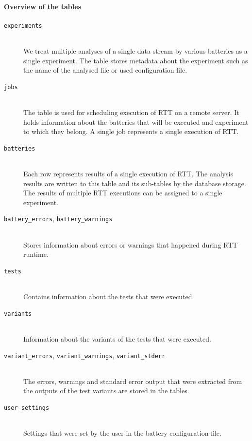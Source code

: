 \documentclass[
	digital,    %
	oneside,    %
	color,
	11pt,
	nocover,
	notable,
	nolof,
	nolot,
]{fithesis3}
\theoremstyle{definition}
\theoremstyle{remark}
\begin{document}
\paragraph*{Overview of the tables}
\begin{description}
\item[\texttt{experiments}] \hfill \\
We treat multiple analyses of a single data stream by various batteries as a single experiment. The table stores metadata about the experiment such as the name of the analysed file or used configuration file.

\item[\texttt{jobs}] \hfill \\
The table is used for scheduling execution of RTT on a remote server. It holds information about the batteries that will be executed and experiment to which they belong. A single job represents a single execution of RTT.

\item[\texttt{batteries}] \hfill \\
Each row represents results of a single execution of RTT. The analysis results are written to this table and its sub-tables by the database storage. The results of multiple RTT executions can be assigned to a single experiment.

\item[\texttt{battery\_errors}, \texttt{battery\_warnings}] \hfill \\
Stores information about errors or warnings that happened during RTT runtime.

\item[\texttt{tests}] \hfill \\
Contains information about the tests that were executed.

\item[\texttt{variants}] \hfill \\
Information about the variants of the tests that were executed.

\item[\texttt{variant\_errors}, \texttt{variant\_warnings}, \texttt{variant\_stderr}] \hfill \\
The errors, warnings and standard error output that were extracted from the outputs of the test variants are stored in the tables.

\item[\texttt{user\_settings}] \hfill \\
Settings that were set by the user in the battery configuration file.


\end{description}
\end{document}
